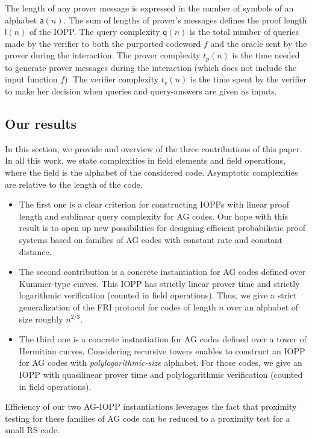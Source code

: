 \documentclass[10pt,a4paper]{article}
\theoremstyle{plain}
\theoremstyle{plain}
\theoremstyle{definition}
\theoremstyle{remark}
\theoremstyle{plain}
\begin{document}
The length of any prover message is expressed in the number of symbols of an alphabet $\mathsf{a}(n)$. The sum of lengths of prover's messages defines the proof length $\mathsf{l}(n)$ of the IOPP. The query complexity $\mathsf{q}(n)$ is the total number of queries made by the verifier to both the purported codeword $f$ and the oracle sent by the prover during the interaction. The prover complexity $t_p(n)$ is the time needed to generate prover messages during the interaction (which does not include the input function $f$). The verifier complexity $t_v(n)$ is the time spent by the verifier to make her decision when queries and query-answers are given as inputs.  


\subsection{Our results}
In this section, we provide and overview of the three contributions of this paper. In all this work, we state complexities in field elements and field operations, where the field is the alphabet of the considered code. Asymptotic complexities are relative to the length of the code.

\begin{itemize}
	\item The first one is a clear criterion for constructing IOPPs with linear proof length and sublinear query complexity for AG codes. Our hope with this result is to open up new possibilities for designing efficient probabilistic proof systems based on families of AG codes with constant rate and constant distance.
	\item The second contribution is a concrete instantiation for AG codes defined over Kummer-type curves. This IOPP has strictly linear prover time and strictly logarithmic verification (counted in field operations). Thus, we give a strict generalization of the \textsf{FRI} protocol for codes of length $n$ over an alphabet of size roughly $n^{2/3}$.
	\item The third one is a concrete instantiation for AG codes defined over a tower of Hermitian curves. Considering recursive towers enables to construct an IOPP for AG codes with \emph{polylogarithmic-size} alphabet. For those codes, we give an IOPP with quasilinear prover time and polylogarithmic verification (counted in field operations).
\end{itemize}

Efficiency of our two AG-IOPP instantiations leverages the fact that proximity testing for these families of AG code can be reduced to a proximity test for a small RS code.
\end{document}
